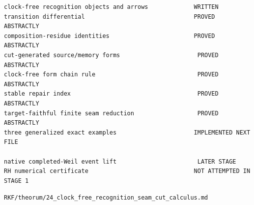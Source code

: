 \begin{verbatim}
clock-free recognition objects and arrows             WRITTEN
transition differential                               PROVED ABSTRACTLY
composition-residue identities                        PROVED ABSTRACTLY
cut-generated source/memory forms                      PROVED ABSTRACTLY
clock-free form chain rule                             PROVED ABSTRACTLY
stable repair index                                    PROVED ABSTRACTLY
target-faithful finite seam reduction                  PROVED ABSTRACTLY
three generalized exact examples                      IMPLEMENTED NEXT FILE

native completed-Weil event lift                       LATER STAGE
RH numerical certificate                              NOT ATTEMPTED IN STAGE 1
\end{verbatim}

\begin{flushright}\small\texttt{RKF/theorum/24\_clock\_free\_recognition\_seam\_cut\_calculus.md}\end{flushright}
